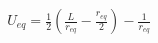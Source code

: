 \documentclass[preview]{standalone}
\begin{document}
\begin{align*}
U_{eq} =\frac{1}{2}\left(\frac{L}{r_{eq}}-\frac{r_{eq}}{2}\right)-\frac{1}{r_{eq}}
\end{align*}
\end{document}

